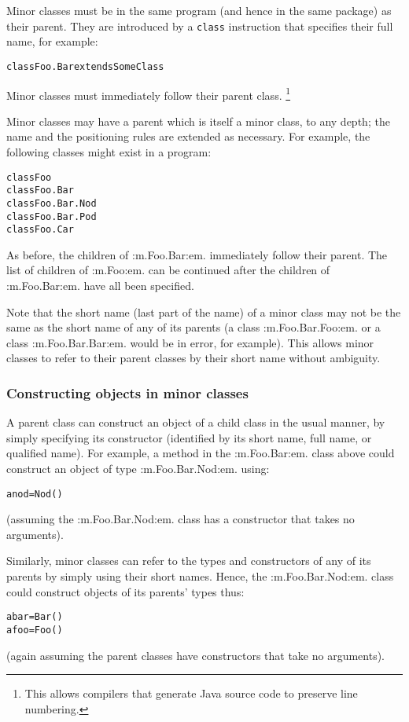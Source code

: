 Minor classes must be in the same program (and hence in the same
package) as their parent.  They are introduced by a \texttt{class}
instruction that specifies their full name, for example:
\begin{alltt}
class Foo.Bar extends SomeClass
\end{alltt}
 
Minor classes must immediately follow their parent class.
\footnote{
This allows compilers that generate Java source code to preserve line
numbering.
}
 
Minor classes may have a parent which is itself a minor class,
to any depth; the name and the positioning rules are extended as
necessary.  For example, the following classes might exist in a program:
\begin{alltt}
class Foo
  class Foo.Bar
    class Foo.Bar.Nod
    class Foo.Bar.Pod
  class Foo.Car
\end{alltt}
 
As before, the children of :m.Foo.Bar:em. immediately follow their
parent.  The list of children of :m.Foo:em. can be continued after
the children of :m.Foo.Bar:em. have all been specified.
 
Note that the short name (last part of the name) of a minor class may
not be the same as the short name of any of its parents (a
class :m.Foo.Bar.Foo:em. or a class :m.Foo.Bar.Bar:em. would be in
error, for example).  This allows minor classes to refer to their parent
classes by their short name without ambiguity.
\subsubsection{Constructing objects in minor classes}
 
A parent class can construct an object of a child class in the usual
manner, by simply specifying its constructor (identified by its short
name, full name, or qualified name).
For example, a method in the :m.Foo.Bar:em. class above could construct
an object of type :m.Foo.Bar.Nod:em. using:
\begin{alltt}
anod=Nod()
\end{alltt}
(assuming the :m.Foo.Bar.Nod:em. class has a constructor that takes no
arguments).
 
Similarly, minor classes can refer to the types and constructors of any
of its parents by simply using their short names.
Hence, the :m.Foo.Bar.Nod:em. class could construct objects of its
parents' types thus:
\begin{alltt}
abar=Bar()
afoo=Foo()
\end{alltt}
(again assuming the parent classes have constructors that take no
arguments).
 
